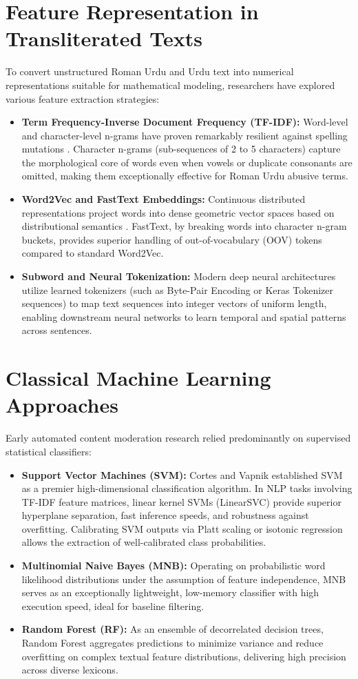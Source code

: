 \documentclass[A4paper,12pt]{report}
\theoremstyle{plain}
\theoremstyle{definition}
\theoremstyle{remark}
\numberwithin{equation}{section}
\begin{document}
\section{Feature Representation in Transliterated Texts}
To convert unstructured Roman Urdu and Urdu text into numerical representations suitable for mathematical modeling, researchers have explored various feature extraction strategies:
\begin{itemize}[leftmargin=*]
    \item \textbf{Term Frequency-Inverse Document Frequency (TF-IDF):} Word-level and character-level n-grams have proven remarkably resilient against spelling mutations \cite{ref9}. Character n-grams (sub-sequences of 2 to 5 characters) capture the morphological core of words even when vowels or duplicate consonants are omitted, making them exceptionally effective for Roman Urdu abusive terms.
    \item \textbf{Word2Vec and FastText Embeddings:} Continuous distributed representations project words into dense geometric vector spaces based on distributional semantics \cite{ref5}. FastText, by breaking words into character n-gram buckets, provides superior handling of out-of-vocabulary (OOV) tokens compared to standard Word2Vec.
    \item \textbf{Subword and Neural Tokenization:} Modern deep neural architectures utilize learned tokenizers (such as Byte-Pair Encoding or Keras Tokenizer sequences) to map text sequences into integer vectors of uniform length, enabling downstream neural networks to learn temporal and spatial patterns across sentences.
\end{itemize}

\section{Classical Machine Learning Approaches}
Early automated content moderation research relied predominantly on supervised statistical classifiers:
\begin{itemize}[leftmargin=*]
    \item \textbf{Support Vector Machines (SVM):} Cortes and Vapnik \cite{ref4} established SVM as a premier high-dimensional classification algorithm. In NLP tasks involving TF-IDF feature matrices, linear kernel SVMs (LinearSVC) provide superior hyperplane separation, fast inference speeds, and robustness against overfitting. Calibrating SVM outputs via Platt scaling or isotonic regression allows the extraction of well-calibrated class probabilities.
    \item \textbf{Multinomial Naive Bayes (MNB):} Operating on probabilistic word likelihood distributions under the assumption of feature independence, MNB serves as an exceptionally lightweight, low-memory classifier with high execution speed, ideal for baseline filtering.
    \item \textbf{Random Forest (RF):} As an ensemble of decorrelated decision trees, Random Forest aggregates predictions to minimize variance and reduce overfitting on complex textual feature distributions, delivering high precision across diverse lexicons.
\end{itemize}
\end{document}
